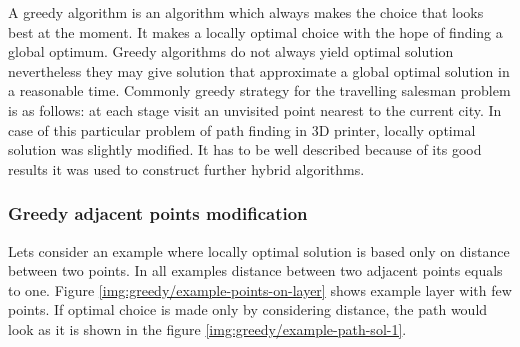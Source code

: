 \documentclass[titlepage]{article}
\begin{document}
A greedy algorithm is an algorithm which always makes the choice that looks best at the moment. It makes a locally optimal choice with the hope of finding a global optimum. Greedy algorithms do not always yield optimal solution nevertheless they may give solution that approximate a global optimal solution in a reasonable time. Commonly greedy strategy for the travelling salesman problem is as follows: at each stage visit an unvisited point nearest to the current city. In case of this particular problem of path finding in 3D printer, locally optimal solution was slightly modified. It has to be well described because of its good results it was used to construct further hybrid algorithms.

\subsubsection{Greedy adjacent points modification}

Lets consider an example where locally optimal solution is based only on distance between two points. In all examples distance between two adjacent points equals to one. Figure \ref{img:greedy/example-points-on-layer} shows example layer with few points. If optimal choice is made only by considering distance, the path would look as it is shown in the figure \ref{img:greedy/example-path-sol-1}.
\end{document}
